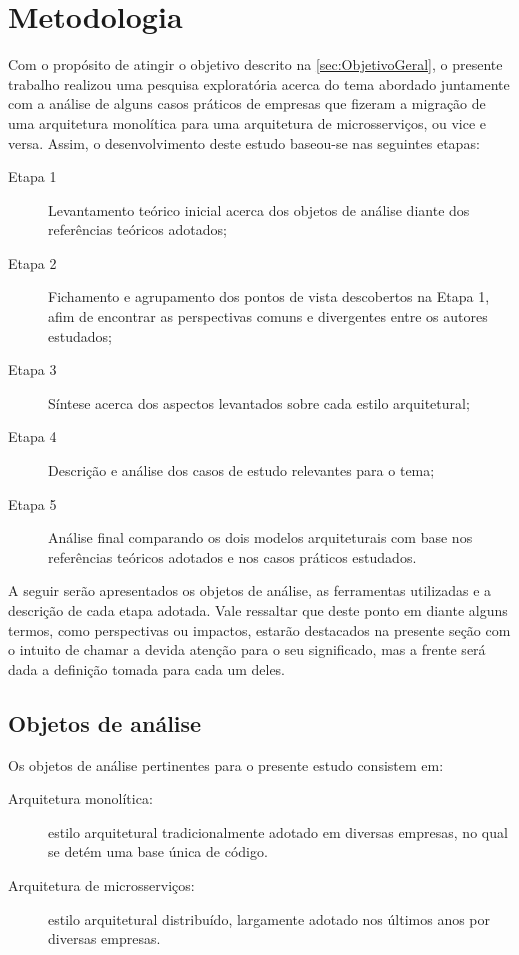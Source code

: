\chapter{Metodologia}
\label{sec:Metodologia}

Com o propósito de atingir o objetivo descrito na \autoref{sec:ObjetivoGeral}, o presente trabalho
realizou uma pesquisa exploratória acerca do tema abordado juntamente com a análise de alguns casos
práticos de empresas que fizeram a migração de uma arquitetura monolítica para uma arquitetura de
microsserviços, ou vice e versa. Assim, o desenvolvimento deste estudo baseou-se nas seguintes etapas:

\begin{description}
    \item [Etapa 1] Levantamento teórico inicial acerca dos objetos de análise diante dos
        referências teóricos adotados;
    \item [Etapa 2] Fichamento e agrupamento dos pontos de vista descobertos na Etapa 1, afim de
        encontrar as perspectivas comuns e divergentes entre os autores estudados;
    \item [Etapa 3] Síntese acerca dos aspectos levantados sobre cada estilo arquitetural;
    \item [Etapa 4] Descrição e análise dos casos de estudo relevantes para o tema;
    \item [Etapa 5] Análise final comparando os dois modelos arquiteturais com base nos referências
        teóricos adotados e nos casos práticos estudados.
\end{description}

A seguir serão apresentados os objetos de análise, as ferramentas utilizadas e a descrição de cada
etapa adotada. Vale ressaltar que deste ponto em diante alguns termos, como perspectivas ou
impactos, estarão destacados na presente seção com o intuito de chamar a devida atenção para o seu
significado, mas a frente será dada a definição tomada para cada um deles.

\section{Objetos de análise}
\label{sec:ObjetosDeAnalise}

Os objetos de análise pertinentes para o presente estudo consistem em:

    \begin{description}
        \item [Arquitetura monolítica:] estilo arquitetural tradicionalmente adotado em diversas
            empresas, no qual se detém uma base única de código.
        \item [Arquitetura de microsserviços:] estilo arquitetural distribuído, largamente adotado
            nos últimos anos por diversas empresas.
    \end{description}

